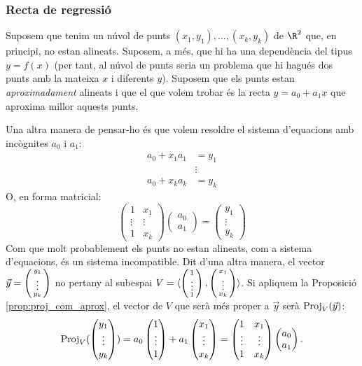 \subsubsection{Recta de regressió}
Suposem que tenim un núvol de punts  $(x_1,y_1), \dots , (x_k,y_k)$ de $\R^2$ que, en principi, no estan alineats. Suposem, a més, que hi ha una dependència del tipus $y=f(x)$ (per tant, al núvol de punts seria un problema que hi hagués dos punts amb la mateixa $x$ i diferents $y$). Suposem que els punts estan \emph{aproximadament} alineats i que el que volem trobar és la recta $y=a_0+a_1x$ que aproxima millor aquests punts. 

Una altra manera de pensar-ho és que volem resoldre el sistema d'equacions amb incògnites $a_0$ i $a_1$:
\begin{align*}
a_ 0 + x_1 a_1 & = y_1 \\ & \vdots  \\ a_0 + x_k a_k & = y_k 
\end{align*}
O, en forma matricial:
\[
\begin{pmatrix} 1 & x_1 \\ \vdots & \vdots \\ 1 & x_k \end{pmatrix}
\begin{pmatrix} a_0 \\ a_1 \end{pmatrix} =
\begin{pmatrix} y_1 \\ \vdots \\ y_k \end{pmatrix}
\]
Com que molt probablement els punts no estan alineats, com a sistema d'equacions, és un sistema incompatible. Dit d'una altra manera, el vector $\vec y=\left(\begin{smallmatrix}y_1 \\ \vdots \\ y_k\end{smallmatrix}\right)$ no pertany al subespai $V=\langle \left(\begin{smallmatrix}1 \\ \vdots \\ 1\end{smallmatrix}\right) , \left(\begin{smallmatrix}x_1 \\ \vdots \\ x_k\end{smallmatrix}\right) \rangle$. Si apliquem la Proposició \ref{prop:proj_com_aprox}, el vector de $V$ que serà més proper a $\vec y$ serà $\operatorname{Proj}_V(\vec y)$:
\[
\operatorname{Proj}_V(\begin{pmatrix} y_1 \\ \vdots \\ y_k \end{pmatrix})= a_0 \begin{pmatrix} 1 \\ \vdots \\ 1 \end{pmatrix} + a_1 \begin{pmatrix} x_1 \\ \vdots \\ x_k \end{pmatrix}= \begin{pmatrix} 1 & x_1 \\ \vdots & \vdots \\ 1 & x_k \end{pmatrix}
\begin{pmatrix} a_0 \\ a_1 \end{pmatrix} .
\]

